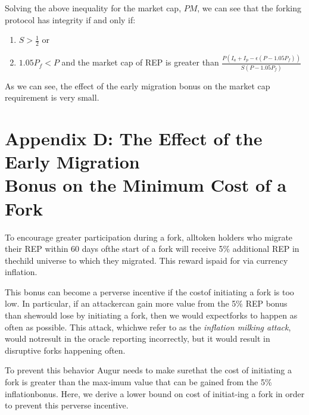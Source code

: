 \documentclass[12pt,floatfix,reprint,nofootinbib,amsmath,amssymb,epsfig,pre,floats,letterpaper,groupedaffiliation]{revtex4-1}
\theoremstyle{definition}
\theoremstyle{definition}
\begin{document}
Solving the above inequality for the market cap, $PM$, we can see that the forking protocol has integrity if and only if:
\begin{enumerate}
\item $S > \frac{1}{2}$ or
\item $1.05P_f < P$ and the market cap of REP is greater than $\frac{P (I_a + I_p - \epsilon (P - 1.05P_f))}{S (P - 1.05P_f)}$
\end{enumerate}

As we can see, the effect of the early migration bonus on the market cap requirement is very small.


\section*{Appendix D: The Effect of the Early Migration\\Bonus on the Minimum Cost of a Fork}

To encourage greater participation during a fork, all\linebreak token holders who migrate their REP within 60 days of\linebreak the start of a fork will receive 5\% additional REP in the\linebreak child universe to which they migrated. This reward is\linebreak paid for via currency inflation.

This bonus can become a perverse incentive if the cost\linebreak of initiating a fork is too low. In particular, if an attacker\linebreak can gain more value from the 5\% REP bonus than she\linebreak would lose by initiating a fork, then we would expect\linebreak forks to happen as often as possible. This attack, which\enlargethispage*{1\baselineskip}\linebreak we refer to as the \textit{inflation milking attack}, would not\linebreak \vspace*{0.8\baselineskip}result in the oracle reporting incorrectly, but it would\vspace*{-0.8\baselineskip} result in disruptive forks happening often.

To prevent this behavior Augur needs to make sure\linebreak that the cost of initiating a fork is greater than the max-\linebreak imum value that can be gained from the 5\% inflation\linebreak bonus. Here, we derive a lower bound on cost of initiat-\linebreak ing a fork in order to prevent this perverse incentive.
\end{document}
